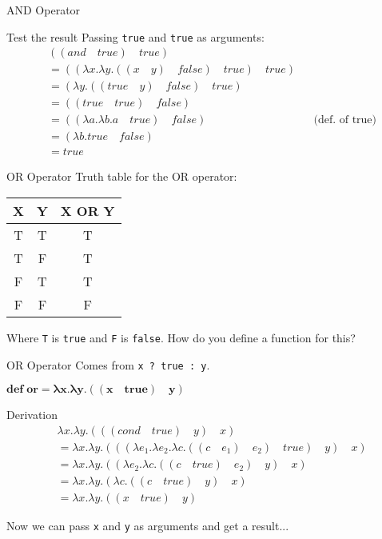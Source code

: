 \documentclass{beamer}
\begin{document}
\begin{frame}{AND Operator}
\begin{block}{Test the result}
Passing \texttt{true} and \texttt{true} as arguments:
\begin{align*}
    &((and \quad true) \quad true) && \\
    &= ((\lambda x . \lambda y . ((x \quad y) \quad false) \quad true) \quad true) &&\\
    &= (\lambda y . ((true \quad y) \quad false) \quad true) &&\\
    &= ((true \quad true) \quad false) &&\\
    &= ((\lambda a . \lambda b . a \quad true) \quad false) && \text{(def. of true)}\\
    &= (\lambda b . true \quad false) &&\\
    &= true &&
\end{align*}
\end{block}
\end{frame}

\begin{frame}{OR Operator}
Truth table for the OR operator:
\begin{table}
\centering
\begin{tabular}{c|c|c}
X & Y & X OR Y \\\hline
T & T & T \\
T & F & T \\
F & T & T \\
F & F & F
\end{tabular}
\end{table}
Where \texttt{T} is \texttt{true} and \texttt{F} is \texttt{false}. How do you define a function for this?
\end{frame}

\begin{frame}{OR Operator}
Comes from \texttt{x ? true : y}.
\begin{framed} $\mathbf{def \; or = \lambda x . \lambda y . ((x \quad true) \quad y)}$ \end{framed}
\begin{block}{Derivation}
\begin{align*}
	&\lambda x . \lambda y . (((cond \quad true) \quad y) \quad x) \\
    &= \lambda x . \lambda y . ((( \lambda e_1 . \lambda e_2 . \lambda c . ((c \quad e_1) \quad e_2) \quad true) \quad y) \quad x) \\
    &= \lambda x . \lambda y . ((\lambda e_2 . \lambda c . ((c \quad true) \quad e_2) \quad y) \quad x) \\
    &= \lambda x . \lambda y . (\lambda c . ((c \quad true) \quad y) \quad x) \\
    &= \lambda x . \lambda y . ((x \quad true) \quad y)
\end{align*}
\end{block}
Now we can pass \texttt{x} and \texttt{y} as arguments and get a result...
\end{frame}
\end{document}
